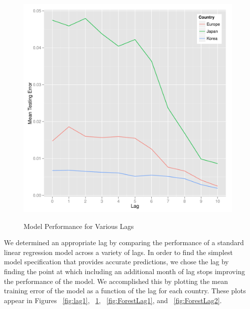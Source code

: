 \documentclass{sig-alternate-05-2015}
\begin{document}
\begin{figure}
\centering
\caption{Model Performance for Various Lags}
\includegraphics[scale=0.45]{lag2.pdf}
\label{fig:lag2}
\end{figure}



We determined an appropriate lag by comparing the performance of a standard linear regression model across a variety of lags. In order to find the simplest model specification that provides accurate predictions, we chose the lag by finding the point at which including an additional month of lag stops improving the performance of the model. We accomplished this by plotting the mean training error of the model as a function of the lag for each country. These plots appear in Figures ~\ref{fig:lag1}, ~\ref{fig:lag2}, ~\ref{fig:ForestLag1}, and ~\ref{fig:ForestLag2}. 
\end{document}
